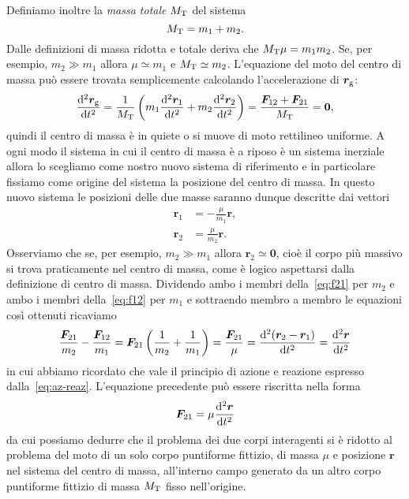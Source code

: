 Definiamo inoltre la \emph{massa totale} $M_\textup{T}$ del sistema
\begin{equation}
  M_\textup{T}=m_1+m_2.
\end{equation}
Dalle definizioni di massa ridotta e totale deriva che
$M_\textup{T}\mu=m_1m_2$. Se, per esempio, $m_2\gg m_1$ allora $\mu\simeq m_1$ e
$M_\textup{T}\simeq m_2$. L'equazione del moto del centro di massa può essere
trovata semplicemente calcolando l'accelerazione di $\bm{r}_\textup{g}$:
\begin{equation}
  \toder[2]{\bm{r}_\textup{g}}{t} = \frac{1}{M_\textup{T}}
  \left(
    m_1\toder[2]{\bm{r}_1}{t} + m_2\toder[2]{\bm{r}_2}{t}
  \right) = \frac{\bm{F}_{12}+\bm{F}_{21}}{M_\textup{T}} = \bm{0},
\end{equation}
quindi il centro di massa è in quiete o si muove di moto rettilineo uniforme. A
ogni modo il sistema in cui il centro di massa è a riposo è un sistema inerziale
allora lo scegliamo come nostro nuovo sistema di riferimento e in particolare
fissiamo come origine del sistema la posizione del centro di massa. In questo
nuovo sistema le posizioni delle due masse saranno dunque descritte dai vettori
\begin{subequations} %
  \begin{align}
    \bm{r}_1 &= -\frac{\mu}{m_1}\bm{r},\\
    \bm{r}_2 &= \frac{\mu}{m_2}\bm{r}.
  \end{align}
\end{subequations}
Osserviamo che se, per esempio, $m_2\gg m_1$ allora $\bm{r}_2\simeq\bm{0}$, cioè
il corpo più massivo si trova praticamente nel centro di massa, come è logico
aspettarsi dalla definizione di centro di massa. Dividendo ambo i membri
della~\eqref{eq:f21} per $m_2$ e ambo i membri della~\eqref{eq:f12} per $m_1$ e
sottraendo membro a membro le equazioni così ottenuti ricaviamo
\begin{equation}
  \frac{\bm{F}_{21}}{m_2}-\frac{\bm{F}_{12}}{m_1} = \bm{F}_{21}
  \left(
    \frac{1}{m_2}+\frac{1}{m_1}
  \right) = \frac{\bm{F}_{21}}{\mu} = \toder[2]{(\bm{r}_2-\bm{r}_1)}{t} =
  \toder[2]{\bm{r}}{t}
\end{equation}
in cui abbiamo ricordato che vale il principio di azione e reazione espresso
dalla~\eqref{eq:az-reaz}. L'equazione precedente può essere riscritta nella forma
\begin{equation}
  \label{eq:f21-mu}
  \bm{F}_{21}=\mu\toder[2]{\bm{r}}{t}
\end{equation}
da cui possiamo dedurre che il problema dei due corpi interagenti si è ridotto
al problema del moto di un solo corpo puntiforme fittizio, di massa $\mu$ e
posizione $\bm{r}$ nel sistema del centro di massa, all'interno campo generato
da un altro corpo puntiforme fittizio di massa $M_\textup{T}$ fisso
nell'origine.

